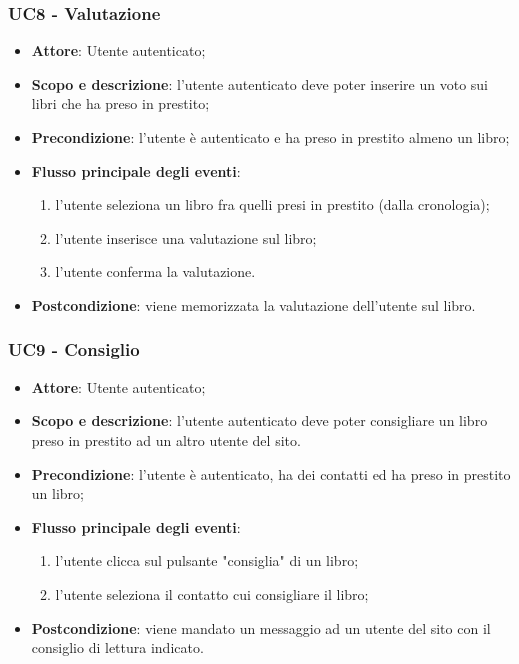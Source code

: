 \subsubsection{UC8 - Valutazione}
\begin{itemize}
	\item \textbf{Attore}: Utente autenticato;
	\item \textbf{Scopo e descrizione}: l'utente autenticato deve poter inserire un voto sui libri che ha preso in prestito;
	\item \textbf{Precondizione}: l'utente è autenticato e ha preso in prestito almeno un libro;
	\item \textbf{Flusso principale degli eventi}:
	\begin{enumerate}
		\item l'utente seleziona un libro fra quelli presi in prestito (dalla cronologia);
		\item l'utente inserisce una valutazione sul libro;
		\item l'utente conferma la valutazione.
	\end{enumerate} 
	\item \textbf{Postcondizione}: viene memorizzata la valutazione dell'utente sul libro.
\end{itemize}

\subsubsection{UC9 - Consiglio}
\begin{itemize}
	\item \textbf{Attore}: Utente autenticato;
	\item \textbf{Scopo e descrizione}: l'utente autenticato deve poter consigliare un libro preso in prestito ad un altro utente del sito.
	\item \textbf{Precondizione}: l'utente è autenticato, ha dei contatti ed ha preso in prestito un libro;
	\item \textbf{Flusso principale degli eventi}:
	\begin{enumerate}
		\item l'utente clicca sul pulsante "consiglia" di un libro;
		\item l'utente seleziona il contatto cui consigliare il libro;
	\end{enumerate} 
	\item \textbf{Postcondizione}: viene mandato un messaggio ad un utente del sito con il consiglio di lettura indicato.
\end{itemize}

